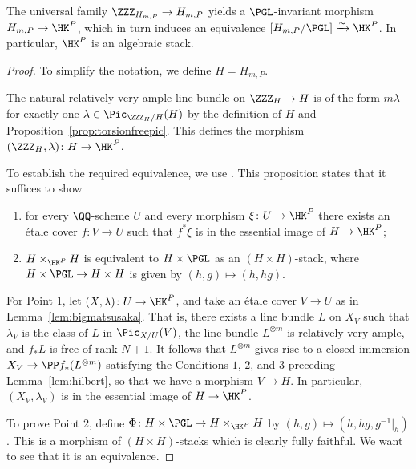 \begin{lemma}\label{lem:hilb_algebraic}
    The universal family $\ZZZ_{H_{m,P}} \rightarrow H_{m,P}$ yields a $\PGL$-invariant morphism $H_{m,P} \rightarrow \HK^P$, which in turn induces an equivalence $\left[{H_{m,P}}/{\PGL}\right] \xrightarrow{\sim} \HK^P$. In particular, $\HK^P$ is an algebraic stack.
\end{lemma}
\begin{proof}
To simplify the notation, we define $H = H_{m,P}$.

The natural relatively very ample line bundle on $\ZZZ_H \rightarrow H$ is of the form $m \lambda$ for exactly one $\lambda \in \Pic_{{\ZZZ_H}/H}(H)$ by the definition of $H$ and Proposition~\ref{prop:torsionfreepic}. This defines the morphism $(\ZZZ_H,\lambda)\colon H \rightarrow \HK^P$.

To establish the required equivalence, we use \cite[Proposition~3.8]{LMB}. This proposition states that it suffices to show
    \begin{enumerate}
        \item for every $\QQ$-scheme $U$ and every morphism $\xi\colon U \rightarrow \HK^P$ there exists an \'etale cover $f\colon V \rightarrow U$ such that $f^* \xi$ is in the essential image of $H \rightarrow \HK^P$;
        \item $H \times_{\HK^P} H$ is equivalent to $H \times \PGL$ as an $(H \times H)$-stack, where $H \times \PGL \rightarrow H \times H$ is given by $(h,g) \mapsto (h,hg)$.
    \end{enumerate}
For Point $1$, let $(X, \lambda)\colon U \rightarrow \HK^P$, and take an \'etale cover $V \rightarrow U$ as in Lemma~\ref{lem:bigmatsusaka}. That is, there exists a line bundle $L$ on $X_V$ such that $\lambda_V$ is the class of $L$ in $\Pic_{X/U}(V)$, the line bundle $L^{\otimes m}$ is relatively very ample, and $f_* L$ is free of rank $N + 1$. It follows that $L^{\otimes m}$ gives rise to a closed immersion $X_V \rightarrow \PP f_*(L^{\otimes m})$ satisfying the Conditions $1$, $2$, and $3$ preceding Lemma~\ref{lem:hilbert}, so that we have a morphism $V \rightarrow H$. In particular, $(X_V,\lambda_V)$ is in the essential image of $H \rightarrow \HK^P$.

To prove Point 2, define $\Phi\colon H \times \PGL \rightarrow H \times_{\HK^P} H$ by $(h,g) \mapsto (h,hg,g^{-1}|_{h})$. This is a morphism of $(H \times H)$-stacks which is clearly fully faithful. We want to see that it is an equivalence. %


\end{proof}
